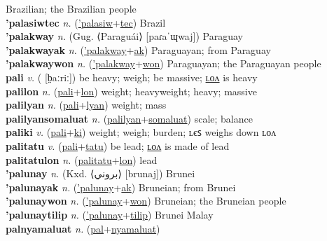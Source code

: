 Brazilian; the Brazilian people \label{'palasiwwon} \\
\textbf{'palasiwtec} \textit{n.} (\hyperref['palasiw]{'palasiw}+\hyperref[tec]{tec})
Brazil \label{'palasiwtec} \\
\textbf{'palakway} \textit{n.} (Gug. ⟨Paraguái⟩ [paɾaˈɰwaj])
Paraguay \label{'palakway} \\
\textbf{'palakwayak} \textit{n.} (\hyperref['palakway]{'palakway}+\hyperref[ak]{ak})
Paraguayan; from Paraguay \label{'palakwayak} \\
\textbf{'palakwaywon} \textit{n.} (\hyperref['palakway]{'palakway}+\hyperref[won]{won})
Paraguayan; the Paraguayan people \label{'palakwaywon} \\
\textbf{pali} \textit{v.} ( [b̤aːriː])
be heavy; weigh; be massive; \hyperref[palilon]{ʟᴏᴧ} is heavy \label{pali} \\
\textbf{palilon} \textit{n.} (\hyperref[pali]{pali}+\hyperref[lon]{lon})
weight; heavyweight; heavy; massive \label{palilon} \\
\textbf{palilyan} \textit{n.} (\hyperref[pali]{pali}+\hyperref[lyan]{lyan})
weight; mass \label{palilyan} \\
\textbf{palilyansomaluat} \textit{n.} (\hyperref[palilyan]{palilyan}+\hyperref[somaluat]{somaluat})
scale; balance \label{palilyansomaluat} \\
\textbf{paliki} \textit{v.} (\hyperref[pali]{pali}+\hyperref[ki]{ki})
weight; weigh; burden; ʟєꜱ weighs down ʟᴏᴧ \label{paliki} \\
\textbf{palitatu} \textit{v.} (\hyperref[pali]{pali}+\hyperref[tatu]{tatu})
be lead; \hyperref[palitatulon]{ʟᴏᴧ} is made of lead \label{palitatu} \\
\textbf{palitatulon} \textit{n.} (\hyperref[palitatu]{palitatu}+\hyperref[lon]{lon})
lead \label{palitatulon} \\
\textbf{'palunay} \textit{n.} (Kxd. ⟨بروني⟩ [brunaj])
Brunei \label{'palunay} \\
\textbf{'palunayak} \textit{n.} (\hyperref['palunay]{'palunay}+\hyperref[ak]{ak})
Bruneian; from Brunei \label{'palunayak} \\
\textbf{'palunaywon} \textit{n.} (\hyperref['palunay]{'palunay}+\hyperref[won]{won})
Bruneian; the Bruneian people \label{'palunaywon} \\
\textbf{'palunaytilip} \textit{n.} (\hyperref['palunay]{'palunay}+\hyperref[tilip]{tilip})
Brunei Malay \label{'palunaytilip} \\
\textbf{palnyamaluat} \textit{n.} (\hyperref[pal]{pal}+\hyperref[nyamaluat]{nyamaluat})
